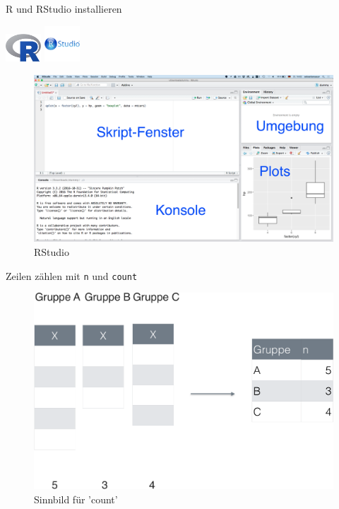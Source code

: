 \documentclass[10pt,ngerman,ignorenonframetext,]{beamer}
\begin{document}
\begin{frame}{R und RStudio installieren}

\includegraphics[width=0.10000\textwidth]{../images/Rahmen/Rlogo.png}
\includegraphics[width=0.10000\textwidth]{../images/Rahmen/rstudiologo.png}

\begin{figure}

{\centering \includegraphics[width=0.5\linewidth]{../images/Rahmen/RStudio-Screenshot} 

}

\caption{RStudio}\label{fig:unnamed-chunk-2}
\end{figure}

\end{frame}

\begin{frame}{Zeilen zählen mit \texttt{n} und \texttt{count}}

\begin{figure}

{\centering \includegraphics[width=0.8\linewidth]{../images/Datenjudo/count-crop} 

}

\caption{Sinnbild für 'count'}\label{fig:fig-count}
\end{figure}

\end{frame}
\end{document}
